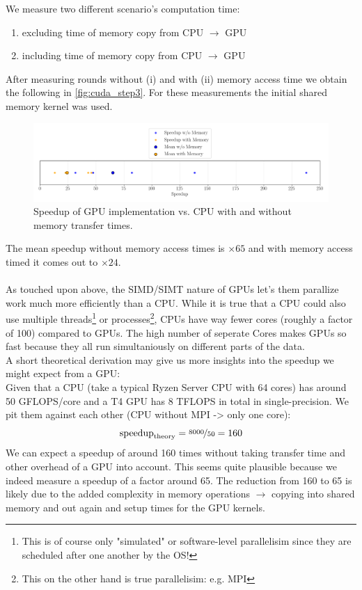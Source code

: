 We measure two different scenario's computation time: 
\begin{enumerate}[i]
    \item excluding time of memory copy from CPU $\rightarrow$ GPU
    \item including time of memory copy from CPU $\rightarrow$ GPU
\end{enumerate}
After measuring  rounds without (i) and with (ii) memory access time we obtain the following  in \autoref{fig:cuda_step3}. For these measurements the initial shared memory kernel was used. 
\begin{figure}[H]
    \centering
    \includegraphics[width=\textwidth]{../fig/lab3/step3.png}
    \caption{Speedup of GPU implementation vs. CPU with and without memory transfer times.}
    \label{fig:cuda_step3}
\end{figure}
The mean speedup without memory access times is $\times 65$ and with memory access timed it comes out to $\times 24$.\\

\\
As touched upon above, the SIMD/SIMT nature of GPUs let's them parallize work much more efficiently than a CPU. While it is true that a CPU could also use multiple threads\footnote{This is of course only "simulated" or software-level parallelisim since they are scheduled after one another by the OS!} or processes\footnote{This on the other hand is true parallelisim: e.g. MPI}, CPUs have way fewer cores (roughly a factor of 100) compared to GPUs. The high number of seperate Cores makes GPUs so fast because they all run simultaniously on different parts of the data.\\
A short theoretical derivation may give us more insights into the speedup we might expect from a GPU: \\
Given that a CPU (take a typical Ryzen Server CPU with 64 cores) has around 50 GFLOPS/core and a T4 GPU has 8 TFLOPS in total in single-precision. We pit them against each other (CPU without MPI -> only one core): 
\[\text{speedup}_\text{theory} = \nicefrac{8000}{50} = 160\]
We can expect a speedup of around 160 times without taking transfer time and other overhead of a GPU into account. This seems quite plausible because we indeed measure a speedup of a factor around 65. The reduction from 160 to 65 is likely due to the added complexity in memory operations $\rightarrow$ copying into shared memory and out again and setup times for the GPU kernels.  

